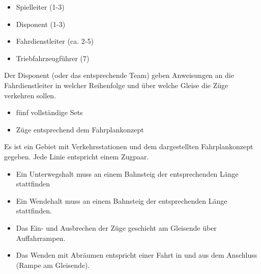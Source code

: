 

  \roles
    \begin{itemize}
      \item Spielleiter (1-3)
      \item Disponent (1-3)
      \item Fahrdienstleiter (ca. 2-5)
      \item Triebfahrzeugführer (7)
    \end{itemize}

  Der Disponent (oder das entsprechende Team) geben Anweisungen an die Fahrdienstleiter in welcher Reihenfolge und über welche Gleise die Züge verkehren sollen.

  \material
    \begin{itemize}
      \item fünf vollständige Sets
      \item Züge entsprechend dem Fahrplankonzept
    \end{itemize}

  \setup
    Es ist ein Gebiet mit Verkehrsstationen und dem dargestellten Fahrplankonzept gegeben. Jede Linie entspricht einem Zugpaar.\\[0.5cm]
    \begin{itemize}
      \item Ein Unterwegshalt muss an einem Bahnsteig der entsprechenden Länge stattfinden
      \item Ein Wendehalt muss an einem Bahnsteig der entsprechenden Länge stattfinden.
      \item Das Ein- und Ausbrechen der Züge geschieht am Gleisende über Auffahrrampen.
      \item Das Wenden mit Abräumen entspricht einer Fahrt in und aus dem Anschluss (Rampe am Gleisende).
    \end{itemize}

